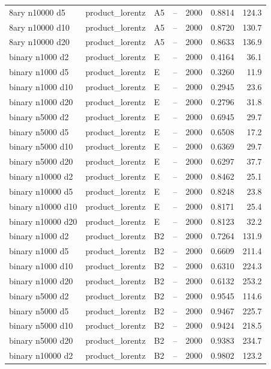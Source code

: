 \begin{longtable}{llllrrr}
8ary n10000 d5 & product\_lorentz & A5 & -- & 2000 & 0.8814 & 124.3 \\
8ary n10000 d10 & product\_lorentz & A5 & -- & 2000 & 0.8720 & 130.7 \\
8ary n10000 d20 & product\_lorentz & A5 & -- & 2000 & 0.8633 & 136.9 \\
binary n1000 d2 & product\_lorentz & E & -- & 2000 & 0.4164 & 36.1 \\
binary n1000 d5 & product\_lorentz & E & -- & 2000 & 0.3260 & 11.9 \\
binary n1000 d10 & product\_lorentz & E & -- & 2000 & 0.2945 & 23.6 \\
binary n1000 d20 & product\_lorentz & E & -- & 2000 & 0.2796 & 31.8 \\
binary n5000 d2 & product\_lorentz & E & -- & 2000 & 0.6945 & 29.7 \\
binary n5000 d5 & product\_lorentz & E & -- & 2000 & 0.6508 & 17.2 \\
binary n5000 d10 & product\_lorentz & E & -- & 2000 & 0.6369 & 29.7 \\
binary n5000 d20 & product\_lorentz & E & -- & 2000 & 0.6297 & 37.7 \\
binary n10000 d2 & product\_lorentz & E & -- & 2000 & 0.8462 & 25.1 \\
binary n10000 d5 & product\_lorentz & E & -- & 2000 & 0.8248 & 23.8 \\
binary n10000 d10 & product\_lorentz & E & -- & 2000 & 0.8171 & 25.4 \\
binary n10000 d20 & product\_lorentz & E & -- & 2000 & 0.8123 & 32.2 \\
binary n1000 d2 & product\_lorentz & B2 & -- & 2000 & 0.7264 & 131.9 \\
binary n1000 d5 & product\_lorentz & B2 & -- & 2000 & 0.6609 & 211.4 \\
binary n1000 d10 & product\_lorentz & B2 & -- & 2000 & 0.6310 & 224.3 \\
binary n1000 d20 & product\_lorentz & B2 & -- & 2000 & 0.6132 & 253.2 \\
binary n5000 d2 & product\_lorentz & B2 & -- & 2000 & 0.9545 & 114.6 \\
binary n5000 d5 & product\_lorentz & B2 & -- & 2000 & 0.9467 & 225.7 \\
binary n5000 d10 & product\_lorentz & B2 & -- & 2000 & 0.9424 & 218.5 \\
binary n5000 d20 & product\_lorentz & B2 & -- & 2000 & 0.9383 & 234.7 \\
binary n10000 d2 & product\_lorentz & B2 & -- & 2000 & 0.9802 & 123.2 \\

\end{longtable}

